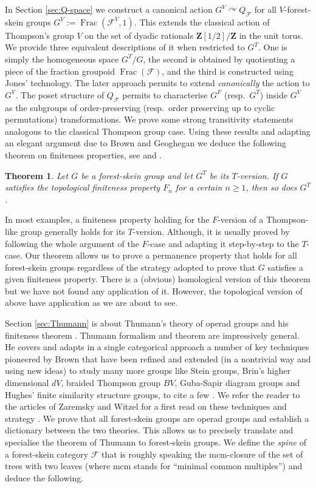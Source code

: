 \documentclass[a4paper, 12pt]{amsart}
\numberwithin{equation}{section}
\newtheorem{lettertheo}{Theorem}
\theoremstyle{definition}
\newcommand{\act}{\curvearrowright}
\newcommand{\cF}{\mathcal F}
\DeclareMathOperator{\Frac}{Frac}
\newcommand{\Z}{\mathbf{Z}}
\begin{document}
In Section \ref{sec:Q-space} we construct a canonical action $G^V\act Q_{\cF}$ for all $V$-forest-skein groups $G^V:=\Frac(\cF^V,1)$.
This extends the classical action of Thompson's group $V$ on the set of dyadic rationals $\Z[1/2]/\Z$ in the unit torus. 
We provide three equivalent descriptions of it when restricted to $G^T$. 
One is simply the homogeneous space $G^T/G$, the second is obtained by quotienting a piece of the fraction groupoid $\Frac(\cF)$, and the third is constructed using Jones' technology.
The later approach permits to extend {\it canonically} the action to $G^V$.
The poset structure of $Q_\cF$ permits to characterise $G^F$ (resp.~$G^T$) inside $G^V$ as the subgroups of order-preserving (resp.~order preserving up to cyclic permutations) transformations.
We prove some strong transitivity statements analogous to the classical Thompson group case. 
Using these results and adapting an elegant argument due to Brown and Geoghegan we deduce the following theorem on finiteness properties, see \cite[Section 4B, Remark 2]{Brown87} and \cite[Theorem 9.4.2]{Geoghegan-book}.

\begin{lettertheo}
Let $G$ be a forest-skein group and let $G^T$ be its $T$-version.
If $G$ satisfies the topological finiteness property $F_n$ for a certain $n\geq 1$, then so does $G^T$.
\end{lettertheo}

In most examples, a finiteness property holding for the $F$-version of a Thompson-like group generally holds for its $T$-version. Although, it is usually proved by following the whole argument of the $F$-case and adapting it step-by-step to the $T$-case.
Our theorem allows us to prove a permanence property that holds for all forest-skein groups regardless of the strategy adopted to prove that $G$ satisfies a given finiteness property.
There is a (obvious) homological version of this theorem but we have not found any application of it. 
However, the topological version of above have application as we are about to see.

Section \ref{sec:Thumann} is about Thumann's theory of operad groups and his finiteness theorem \cite{Thumann17}.
Thumann formalism and theorem are impressively general.
He covers and adapts in a single categorical approach a number of key techniques pioneered by Brown that have been refined and extended (in a nontrivial way and using new ideas) to study many more groups like Stein groups, Brin's higher dimensional $dV$, braided Thompson group $BV$, Guba-Sapir diagram groups and Hughes' finite similarity structure groups, to cite a few \cite{Brown87,Stein92,Fluch-Marschler-Witzel-Zaremsky13, Bux-Fluch-Marschler-Witzel-Zaremsky16,Farley-Hughes15}. 
We refer the reader to the articles of Zaremsky and Witzel for a first read on these techniques and strategy \cite{Zaremsky21,Witzel19}.
We prove that all forest-skein groups are operad groups and establish a dictionary between the two theories.
This allows us to precisely translate and specialise the theorem of Thumann to forest-skein groups.
We define the {\it spine} of a forest-skein category $\cF$ that is roughly speaking the mcm-closure of the set of trees with two leaves (where mcm stands for ``minimal common multiples'') and deduce the following.
\end{document}
